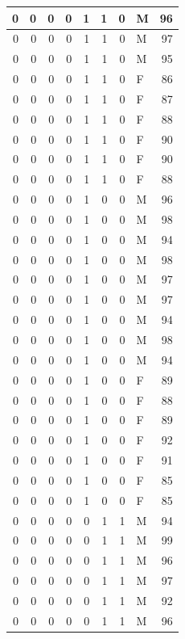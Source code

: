 \documentclass[
  12pt,
]{krantz}
\begin{document}
\begin{tabular}{r|r|r|r|r|r|r|l|r}
\hline
0 & 0 & 0 & 0 & 1 & 1 & 0 & M & 96\\
\hline
0 & 0 & 0 & 0 & 1 & 1 & 0 & M & 97\\
\hline
0 & 0 & 0 & 0 & 1 & 1 & 0 & M & 95\\
\hline
0 & 0 & 0 & 0 & 1 & 1 & 0 & F & 86\\
\hline
0 & 0 & 0 & 0 & 1 & 1 & 0 & F & 87\\
\hline
0 & 0 & 0 & 0 & 1 & 1 & 0 & F & 88\\
\hline
0 & 0 & 0 & 0 & 1 & 1 & 0 & F & 90\\
\hline
0 & 0 & 0 & 0 & 1 & 1 & 0 & F & 90\\
\hline
0 & 0 & 0 & 0 & 1 & 1 & 0 & F & 88\\
\hline
0 & 0 & 0 & 0 & 1 & 0 & 0 & M & 96\\
\hline
0 & 0 & 0 & 0 & 1 & 0 & 0 & M & 98\\
\hline
0 & 0 & 0 & 0 & 1 & 0 & 0 & M & 94\\
\hline
0 & 0 & 0 & 0 & 1 & 0 & 0 & M & 98\\
\hline
0 & 0 & 0 & 0 & 1 & 0 & 0 & M & 97\\
\hline
0 & 0 & 0 & 0 & 1 & 0 & 0 & M & 97\\
\hline
0 & 0 & 0 & 0 & 1 & 0 & 0 & M & 94\\
\hline
0 & 0 & 0 & 0 & 1 & 0 & 0 & M & 98\\
\hline
0 & 0 & 0 & 0 & 1 & 0 & 0 & M & 94\\
\hline
0 & 0 & 0 & 0 & 1 & 0 & 0 & F & 89\\
\hline
0 & 0 & 0 & 0 & 1 & 0 & 0 & F & 88\\
\hline
0 & 0 & 0 & 0 & 1 & 0 & 0 & F & 89\\
\hline
0 & 0 & 0 & 0 & 1 & 0 & 0 & F & 92\\
\hline
0 & 0 & 0 & 0 & 1 & 0 & 0 & F & 91\\
\hline
0 & 0 & 0 & 0 & 1 & 0 & 0 & F & 85\\
\hline
0 & 0 & 0 & 0 & 1 & 0 & 0 & F & 85\\
\hline
0 & 0 & 0 & 0 & 0 & 1 & 1 & M & 94\\
\hline
0 & 0 & 0 & 0 & 0 & 1 & 1 & M & 99\\
\hline
0 & 0 & 0 & 0 & 0 & 1 & 1 & M & 96\\
\hline
0 & 0 & 0 & 0 & 0 & 1 & 1 & M & 97\\
\hline
0 & 0 & 0 & 0 & 0 & 1 & 1 & M & 92\\
\hline
0 & 0 & 0 & 0 & 0 & 1 & 1 & M & 96\\

\end{tabular}
\end{document}
